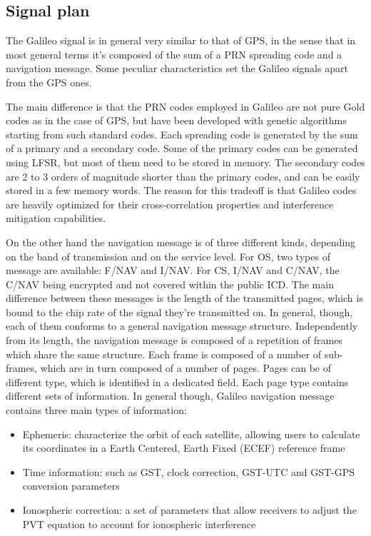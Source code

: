 \subsection{Signal plan}
The Galileo signal is in general very similar to that of GPS, in the sense that
in most general terms it's composed of the sum of a PRN spreading code and a
navigation message. Some peculiar characteristics set the Galileo signals apart
from the GPS ones.

The main difference is that the PRN codes employed in Galileo are not pure Gold
codes as in the case of GPS, but have been developed with genetic algorithms
starting from such standard codes. Each spreading code is generated by the sum
of a primary and a secondary code. Some of the primary codes can be generated
using LFSR, but most of them need to be stored in memory. The secondary codes
are 2 to 3 orders of magnitude shorter than the primary codes, and can be easily
stored in a few memory words. The reason for this tradeoff is that Galileo codes
are heavily optimized for their cross-correlation properties and interference
mitigation capabilities.

On the other hand the navigation message is of three different kinds, depending
on the band of transmission and on the service level. For OS, two types of
message are available: F/NAV and I/NAV. For CS, I/NAV and C/NAV, the C/NAV being
encrypted and not covered within the public ICD. The main difference between
these messages is the length of the transmitted pages, which is bound to the
chip rate of the signal they're transmitted on. In general, though, each of them
conforms to a general navigation message structure.  Independently from its
length, the navigation message is composed of a repetition of frames which share
the same structure. Each frame is composed of a number of sub-frames, which are
in turn composed of a number of pages. Pages can be of different type, which is
identified in a dedicated field. Each page type contains different sets of
information. In general though, Galileo navigation message contains three main
types of information:
\begin{itemize}
  \item Ephemeris: characterize the orbit of each satellite, allowing users to
    calculate its coordinates in a Earth Centered, Earth Fixed (ECEF) reference
    frame
  \item Time information: such as GST, clock correction, GST-UTC and GST-GPS
    conversion parameters
  \item Ionospheric correction: a set of parameters that allow receivers to
    adjust the PVT equation to account for ionospheric interference
\end{itemize}

